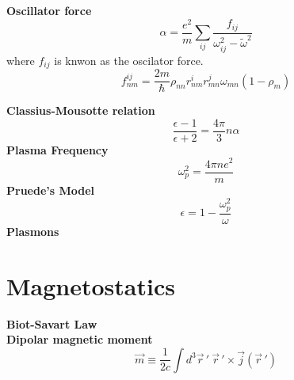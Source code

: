 \documentclass[12pt,a4paper]{article}
\begin{document}
\textbf{Oscillator force}\\
\begin{equation}
	\alpha = \frac{e^2}{m}\sum_{ij} \frac{f_{ij}}{\omega_{ij}^2-\tilde{\omega}^2}
\end{equation}
where $f_{ij}$ is knwon as the oscilator force.
\begin{equation}
	f_{nm}^{ij} = \frac{2m}{\hbar}\rho_{nn}r_{nm}^ir_{mn}^j\omega_{mn} (1-\rho_m)
\end{equation}

\textbf{Classius-Mousotte relation}\\
\begin{equation}
	\frac{\epsilon -1}{\epsilon + 2} = \frac{4\pi}{3}n\alpha
\end{equation}
\textbf{Plasma Frequency}\\
\begin{equation}
	\omega_p^2 = \frac{4\pi n e^2}{m}
\end{equation}
\textbf{Pruede's Model}\\
\begin{equation}
	\epsilon = 1 - \frac{\omega_p^2}{\omega}
\end{equation}
\textbf{Plasmons}\\

\section{Magnetostatics}

\textbf{Biot-Savart Law}\\

\textbf{Dipolar magnetic moment}
\begin{equation}
	\vec{m} \equiv \frac{1}{2c} \int d^3 \vec{r}\,' \ \vec{r}\,'\times \vec{j}(\vec{r}\, ')
\end{equation}
\end{document}
